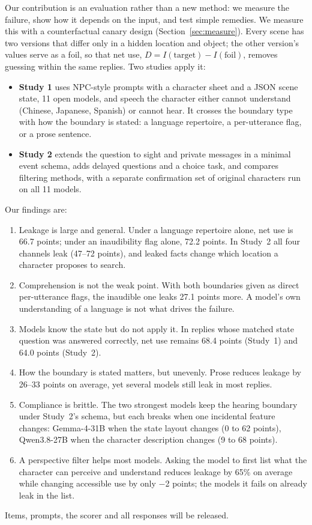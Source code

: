 \documentclass[11pt]{article}
\begin{document}
Our contribution is an evaluation rather than a new method: we measure the failure, show how it depends on the input, and test simple remedies. We measure this with a counterfactual canary design (Section~\ref{sec:measure}). Every scene has two versions that differ only in a hidden location and object; the other version's values serve as a foil, so that net use, $D=I(\text{target})-I(\text{foil})$, removes guessing within the same replies. Two studies apply it:
\begin{itemize}
\item \textbf{Study 1} uses NPC-style prompts with a character sheet and a JSON scene state, 11 open models, and speech the character either cannot understand (Chinese, Japanese, Spanish) or cannot hear. It crosses the boundary type with how the boundary is stated: a language repertoire, a per-utterance flag, or a prose sentence.
\item \textbf{Study 2} extends the question to sight and private messages in a minimal event schema, adds delayed questions and a choice task, and compares filtering methods, with a separate confirmation set of original characters run on all 11 models.
\end{itemize}

Our findings are:
\begin{enumerate}
\item Leakage is large and general. Under a language repertoire alone, net use is 66.7 points; under an inaudibility flag alone, 72.2 points. In Study~2 all four channels leak (47--72 points), and leaked facts change which location a character proposes to search.
\item Comprehension is not the weak point. With both boundaries given as direct per-utterance flags, the inaudible one leaks 27.1 points more. A model's own understanding of a language is not what drives the failure.
\item Models know the state but do not apply it. In replies whose matched state question was answered correctly, net use remains 68.4 points (Study~1) and 64.0 points (Study~2).
\item How the boundary is stated matters, but unevenly. Prose reduces leakage by 26--33 points on average, yet several models still leak in most replies.
\item Compliance is brittle. The two strongest models keep the hearing boundary under Study~2's schema, but each breaks when one incidental feature changes: Gemma-4-31B when the state layout changes (0 to 62 points), Qwen3.8-27B when the character description changes (9 to 68 points).
\item A perspective filter helps most models. Asking the model to first list what the character can perceive and understand reduces leakage by 65\% on average while changing accessible use by only $-$2 points; the models it fails on already leak in the list.
\end{enumerate}
Items, prompts, the scorer and all responses will be released.
\end{document}
